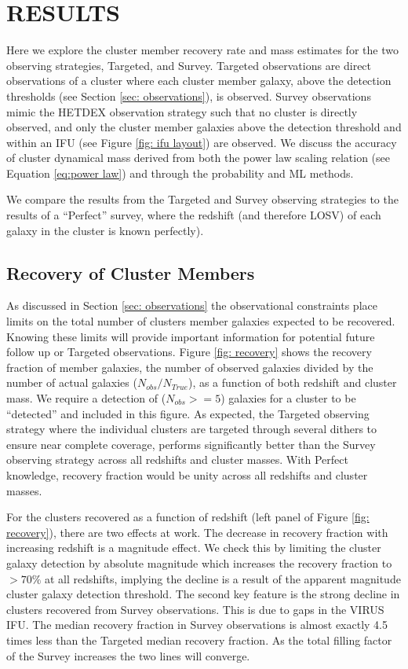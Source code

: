 \documentclass[fleqn,usenatbib]{mnras}
\begin{document}
\section{RESULTS}\label{sec:results}
Here we explore the cluster member recovery rate and mass estimates for the two observing strategies, Targeted, and Survey. Targeted observations are direct observations of a cluster where each cluster member galaxy, above the detection thresholds (see Section \ref{sec: observations}), is observed. Survey observations mimic the HETDEX observation strategy such that no cluster is directly observed, and only the cluster member galaxies above the detection threshold and within an IFU (see Figure \ref{fig: ifu layout}) are observed.  We discuss the accuracy of cluster dynamical mass derived from both the power law scaling relation (see Equation \ref{eq:power law}) and through the probability and ML methods.

We compare the results from the Targeted and Survey observing strategies to the results of a ``Perfect'' survey, where the redshift (and therefore LOSV) of each galaxy in the cluster is known perfectly).

\subsection{Recovery of Cluster Members}
As discussed in Section \ref{sec: observations} the observational constraints place limits on the total number of clusters member galaxies expected to be recovered. Knowing these limits will provide important information for potential future follow up or Targeted observations. Figure \ref{fig: recovery} shows the recovery fraction of member galaxies, the number of observed galaxies divided by the number of actual galaxies ($N_{obs}/N_{True}$), as a function of both redshift and cluster mass. We require a detection of ($N_{obs} >=5$) galaxies for a cluster to be “detected” and included in this figure. As expected, the Targeted observing strategy where the individual clusters are targeted through several dithers to ensure near complete coverage, performs significantly better than the Survey observing strategy across all redshifts and cluster masses. With Perfect knowledge, recovery fraction would be unity across all redshifts and cluster masses.

For the clusters recovered as a function of redshift (left panel of Figure \ref{fig: recovery}), there are two effects at work. The decrease in recovery fraction with increasing redshift is a magnitude effect. We check this by limiting the cluster galaxy detection by absolute magnitude which increases the recovery fraction to $>70\%$ at all redshifts, implying the decline is a result of the apparent magnitude cluster galaxy detection threshold. The second key feature is the strong decline in clusters recovered from Survey observations. This is due to gaps in the VIRUS IFU. The median recovery fraction in Survey observations is almost exactly 4.5 times less than the Targeted median recovery fraction. As the total filling factor of the Survey increases the two lines will converge.
\end{document}
